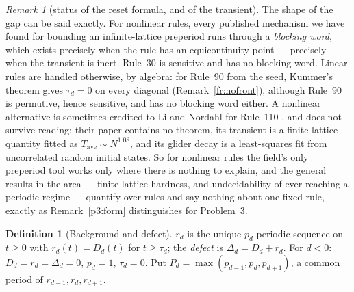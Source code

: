 \documentclass[11pt]{article}
\theoremstyle{definition}
\newtheorem{definition}[theorem]{Definition}
\theoremstyle{remark}
\newtheorem{remark}[theorem]{Remark}
\begin{document}
\begin{remark}[status of the reset formula, and of the transient]
The shape of the gap can be said exactly. For nonlinear rules, every published mechanism we have found for bounding an infinite-lattice
preperiod runs through a \emph{blocking word}, which exists precisely when the rule has an
equicontinuity point --- precisely when the transient is inert. Rule~30 is sensitive and has no blocking
word. Linear rules are handled otherwise, by algebra: for Rule~90 from the seed, Kummer's theorem gives $\tau_d=0$ on every
diagonal (Remark~\ref{fr:nofront}), although Rule~90 is permutive, hence sensitive, and has no blocking word either.
A nonlinear alternative is sometimes credited to Li and Nordahl for Rule~110 \cite{LN}, and does not survive
reading: their paper contains no theorem, its transient is a finite-lattice quantity fitted as
$T_{\mathrm{ave}}\sim N^{1.08}$, and its glider decay is a least-squares fit from uncorrelated random
initial states. So for nonlinear rules the field's only preperiod tool works only where there is nothing to explain, and
the general results in the area --- finite-lattice hardness, and undecidability of ever reaching a
periodic regime --- quantify over rules and say nothing about one fixed rule, exactly as
Remark~\ref{p3:form} distinguishes for Problem~3.
\end{remark}


\begin{definition}[Background and defect]\label{fr:def:bg}
$r_d$ is the unique $p_d$-periodic sequence on $t\ge0$ with $r_d(t)=D_d(t)$ for $t\ge\tau_d$;
the \emph{defect} is $\Delta_d=D_d+r_d$. For $d<0$: $D_d=r_d=\Delta_d=0$, $p_d=1$, $\tau_d=0$.
Put $P_d=\max(p_{d-1},p_d,p_{d+1})$, a common period of $r_{d-1},r_d,r_{d+1}$.
\end{definition}
\end{document}
